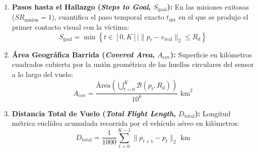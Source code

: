 \begin{enumerate}
    \item \textbf{Pasos hasta el Hallazgo (\textit{Steps to Goal}, $S_{\text{goal}}$):} En las misiones exitosas ($SR_{\text{misión}} = 1$), cuantifica el paso temporal exacto $t_{\text{det}}$ en el que se produjo el primer contacto visual con la víctima:
    \begin{equation}
        S_{\text{goal}} = \min \left\{ t \in [0, K] \mid \|p_t - v_{\text{real}}\|_2 \le R_d \right\}
    \end{equation}

    \item \textbf{Área Geográfica Barrida (\textit{Covered Area}, $A_{\text{cov}}$):} Superficie en kilómetros cuadrados cubierta por la unión geométrica de las huellas circulares del sensor a lo largo del vuelo:
    \begin{equation}
        A_{\text{cov}} = \frac{\text{Área}\left( \bigcup_{t=0}^{K} \mathcal{B}(p_t, R_d) \right)}{10^6} \text{ km}^2
    \end{equation}

    \item \textbf{Distancia Total de Vuelo (\textit{Total Flight Length}, $D_{\text{total}}$):} Longitud métrica euclídea acumulada recorrida por el vehículo aéreo en kilómetros:
    \begin{equation}
        D_{\text{total}} = \frac{1}{1000} \sum_{t=0}^{K-1} \|p_{t+1} - p_t\|_2 \text{ km}
    \end{equation}
\end{enumerate}
